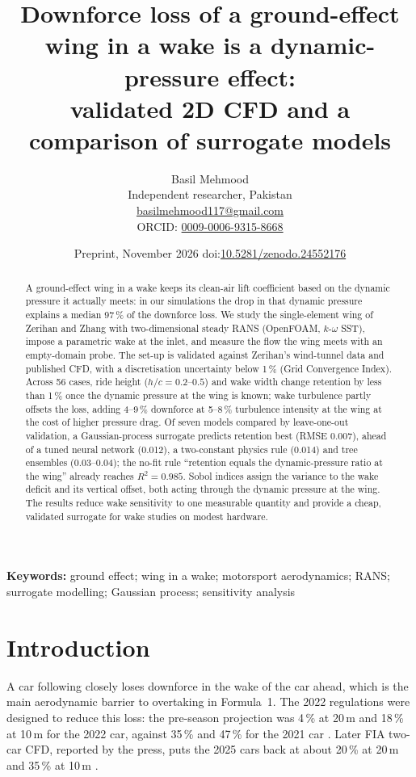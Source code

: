 \documentclass[11pt,a4paper]{article}
\title{Downforce loss of a ground-effect wing in a wake is a dynamic-pressure effect:\\
validated 2D CFD and a comparison of surrogate models}
\author{Basil Mehmood\\[2pt]
\small Independent researcher, Pakistan\\
\small \href{mailto:basilmehmood117@gmail.com}{basilmehmood117@gmail.com}\\
\small ORCID: \href{https://orcid.org/0009-0006-9315-8668}{0009-0006-9315-8668}}
\date{Preprint, November 2026 \quad doi:\href{https://doi.org/10.5281/zenodo.24552176}{10.5281/zenodo.24552176}}
\begin{document}
\maketitle

\begin{abstract}
A ground-effect wing in a wake keeps its clean-air lift coefficient based on the dynamic pressure it actually meets: in our simulations the drop in that dynamic pressure explains a median 97\,\% of the downforce loss. We study the single-element wing of Zerihan and Zhang with two-dimensional steady RANS (OpenFOAM, $k$-$\omega$ SST), impose a parametric wake at the inlet, and measure the flow the wing meets with an empty-domain probe. The set-up is validated against Zerihan's wind-tunnel data and published CFD, with a discretisation uncertainty below 1\,\% (Grid Convergence Index). Across 56 cases, ride height ($h/c = 0.2$--$0.5$) and wake width change retention by less than 1\,\% once the dynamic pressure at the wing is known; wake turbulence partly offsets the loss, adding 4--9\,\% downforce at 5--8\,\% turbulence intensity at the wing at the cost of higher pressure drag. Of seven models compared by leave-one-out validation, a Gaussian-process surrogate predicts retention best (RMSE 0.007), ahead of a tuned neural network (0.012), a two-constant physics rule (0.014) and tree ensembles (0.03--0.04); the no-fit rule ``retention equals the dynamic-pressure ratio at the wing'' already reaches $R^2 = 0.985$. Sobol indices assign the variance to the wake deficit and its vertical offset, both acting through the dynamic pressure at the wing. The results reduce wake sensitivity to one measurable quantity and provide a cheap, validated surrogate for wake studies on modest hardware.
\end{abstract}

\noindent\textbf{Keywords:} ground effect; wing in a wake; motorsport aerodynamics; RANS; surrogate modelling; Gaussian process; sensitivity analysis

\section{Introduction}
A car following closely loses downforce in the wake of the car ahead, which is the main aerodynamic barrier to overtaking in Formula~1. The 2022 regulations were designed to reduce this loss: the pre-season projection was 4\,\% at 20\,m and 18\,\% at 10\,m for the 2022 car, against 35\,\% and 47\,\% for the 2021 car \cite{f1_2021}. Later FIA two-car CFD, reported by the press, puts the 2025 cars back at about 20\,\% at 20\,m and 35\,\% at 10\,m \cite{race_2025}.
\end{document}
